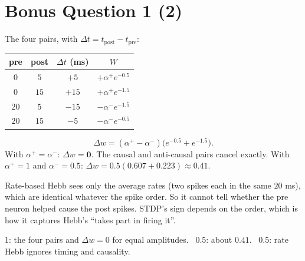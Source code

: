 \documentclass[11pt,letterpaper]{article}
\begin{document}
\section*{Bonus Question 1 \hfill (2)}
The four pairs, with $\Delta t = t_{\mathrm{post}} - t_{\mathrm{pre}}$:
\begin{center}
\renewcommand{\arraystretch}{1.15}
\begin{tabular}{c|c|c|c}
pre & post & $\Delta t$ (ms) & $W$ \\ \hline
$0$ & $5$ & $+5$ & $+\alpha^+e^{-0.5}$\\
$0$ & $15$ & $+15$ & $+\alpha^+e^{-1.5}$\\
$20$ & $5$ & $-15$ & $-\alpha^-e^{-1.5}$\\
$20$ & $15$ & $-5$ & $-\alpha^-e^{-0.5}$
\end{tabular}
\end{center}
\[
\Delta w = (\alpha^+ - \alpha^-)\bigl(e^{-0.5} + e^{-1.5}\bigr).
\]
With $\alpha^+ = \alpha^-$: $\Delta w = \mathbf 0$. The causal and anti-causal pairs cancel exactly. With $\alpha^+ = 1$ and $\alpha^- = 0.5$: $\Delta w = 0.5(0.607 + 0.223) \approx \mathbf{0.41}$.

Rate-based Hebb sees only the average rates (two spikes each in the same $20$ ms), which are identical whatever the spike order. So it cannot tell whether the pre neuron helped cause the post spikes. STDP's sign depends on the order, which is how it captures Hebb's ``takes part in firing it''.
\begin{marking}
1: the four pairs and $\Delta w = 0$ for equal amplitudes. \ 0.5: about $0.41$. \ 0.5: rate Hebb ignores timing and causality.
\end{marking}
\end{document}
